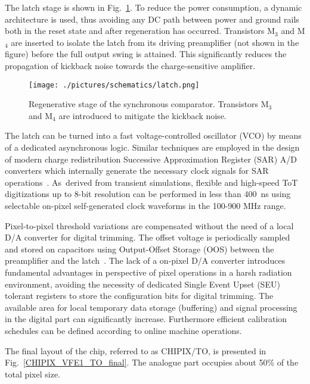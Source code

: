 \documentclass[conference]{./templates/IEEEtran/IEEEtran}
\begin{document}
The latch stage is shown in Fig.~\ref{latch}. To reduce the power consumption, a dynamic architecture 
is used, thus avoiding any DC path between power and ground rails both in the reset state and after 
regeneration has occurred. Transistors M$_3$ and M$_4$ are inserted to isolate the latch from its driving preamplifier 
(not shown in the figure) before the full output swing is attained. This significantly reduces the propagation 
of kickback noise towards the charge-sensitive amplifier.



\begin{center}
\begin{figure}[!htpb]
\centering
\texttt{[image: ./pictures/schematics/latch.png]}
\caption{Regenerative stage of the synchronous comparator. Transistors M$_3$ and M$_4$ are introduced to mitigate 
         the kickback noise.}
\label{latch}
\end{figure}
\end{center}



The latch can be turned into a fast voltage-controlled oscillator (VCO) 
by means of a dedicated asynchronous logic. Similar techniques are employed 
in the design of modern charge redistribution Successive Approximation 
Register (SAR) A/D converters which internally generate the necessary clock signals 
for SAR operations~\cite{Liu2010}. As~derived from transient simulations,
flexible and high-speed ToT digitizations up to 8-bit resolution can
be performed in less than 400~ns using selectable on-pixel 
self-generated clock waveforms in the 100-900 MHz range.

Pixel-to-pixel threshold variations are compensated without the need 
of a local D/A converter for digital trimming. The offset voltage is periodically 
sampled and stored on capacitors using Output-Offset Storage (OOS) between the 
preamplifier and the latch~\cite{Razavi1992}. The lack of a on-pixel D/A converter 
introduces fundamental advantages in perspective of pixel operations in a harsh radiation 
environment, avoiding the necessity of dedicated Single Event Upset (SEU) tolerant registers 
to store the configuration bits for digital trimming. The available area for local temporary 
data storage (buffering) and signal processing in the digital part can significantly increase. Furthermore 
efficient calibration schedules can be defined according to online machine operations. 

The final layout of the chip, referred to as CHIPIX/TO, is presented in Fig.~\ref{CHIPIX_VFE1_TO_final}. 
The analogue part occupies about 50\% of the total pixel size.
\end{document}
